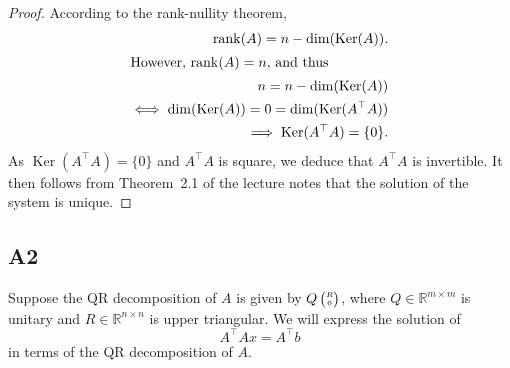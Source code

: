 \documentclass[11pt]{article}
\DeclareMathOperator{\rank}{rank}
\DeclareMathOperator{\Ker}{Ker}
\newcommand{\real}{\mathbb{R}} %
\begin{document}
\begin{proof}
According to the rank-nullity theorem,
\begin{align*}
    \rank(A) = n - \dim(\Ker(A)). \\
    \intertext{However, \(\rank(A) = n\), and thus}
    n = n - \dim(\Ker(A)) \\
    \iff \dim(\Ker(A))= 0 = \dim(\Ker(A^\top A)) \\
    \implies \Ker(A^\top A) = \{0\}.
\end{align*}
As $\Ker(A^\top A)=\{0\}$ and $A^\top A$ is square, we deduce that $A^\top A$ is invertible. It then follows from Theorem~2.1 of the lecture notes that the solution of the system is unique.
\end{proof}

\subsection*{A2}
Suppose the QR decomposition of $A$ is given by $\tiny{Q \begin{pmatrix}R\\0\end{pmatrix}}$, where $Q \in \real^{m\times m}$ is unitary and $R \in \real^{n\times n}$ is upper triangular. We will express the solution of 
\begin{equation}\label{eqA2}
    A^\top Ax=A^\top b
\end{equation} in terms of the QR decomposition of \(A\).
\end{document}
